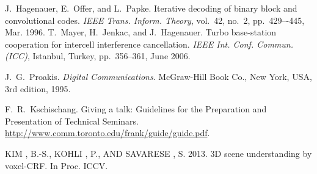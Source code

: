 \documentclass{llncs}
\begin{document}
% 



\begin{thebibliography}{1}

	J.~Hagenauer, E.~Offer, and L.~Papke. Iterative decoding of binary block
	and convolutional codes. {\em IEEE Trans. Inform. Theory},
	vol.~42, no.~2, pp.~429–-445, Mar. 1996.
	T.~Mayer, H.~Jenkac, and J.~Hagenauer. Turbo base-station cooperation for intercell interference cancellation. {\em IEEE Int. Conf. Commun. (ICC)}, Istanbul, Turkey, pp.~356--361, June 2006.

	J.~G.~Proakis. {\em Digital Communications}. McGraw-Hill Book Co.,
	New York, USA, 3rd edition, 1995.

	F.~R.~Kschischang. Giving a talk: Guidelines for the Preparation and Presentation of Technical Seminars.
	\url{http://www.comm.toronto.edu/frank/guide/guide.pdf}.

	KIM , B.-S., KOHLI , P., AND SAVARESE , S. 2013. 3D scene understanding by voxel-CRF. In Proc. ICCV.
	
\end{thebibliography}

\end{document}
